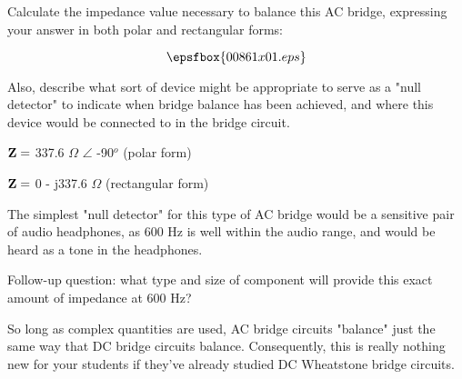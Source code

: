 

Calculate the impedance value necessary to balance this AC bridge, expressing your answer in both polar and rectangular forms:

$$\epsfbox{00861x01.eps}$$

Also, describe what sort of device might be appropriate to serve as a "null detector" to indicate when bridge balance has been achieved, and where this device would be connected to in the bridge circuit.







${\bf Z} =$ 337.6 $\Omega$ $\angle$ -90$^{o}$ (polar form)

${\bf Z} =$ 0 - j337.6 $\Omega$ (rectangular form)

\vskip 10pt

The simplest "null detector" for this type of AC bridge would be a sensitive pair of audio headphones, as 600 Hz is well within the audio range, and would be heard as a tone in the headphones.

\vskip 10pt

Follow-up question: what type and size of component will provide this exact amount of impedance at 600 Hz?







So long as complex quantities are used, AC bridge circuits "balance" just the same way that DC bridge circuits balance.  Consequently, this is really nothing new for your students if they've already studied DC Wheatstone bridge circuits.




